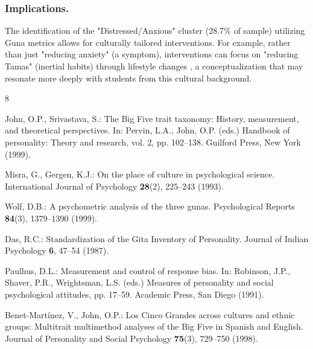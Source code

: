 \documentclass[runningheads]{llncs}
\begin{document}
\subsubsection{Implications.}
The identification of the "Distressed/Anxious" cluster (28.7\% of sample) utilizing Guna metrics allows for culturally tailored interventions. For example, rather than just "reducing anxiety" (a symptom), interventions can focus on "reducing Tamas" (inertial habits) through lifestyle changes \cite{wolf1999}, a conceptualization that may resonate more deeply with students from this cultural background.

\begin{thebibliography}{8}

John, O.P., Srivastava, S.: The Big Five trait taxonomy: History, measurement, and theoretical perspectives. In: Pervin, L.A., John, O.P. (eds.) Handbook of personality: Theory and research, vol. 2, pp. 102--138. Guilford Press, New York (1999).

Misra, G., Gergen, K.J.: On the place of culture in psychological science. International Journal of Psychology \textbf{28}(2), 225--243 (1993).

Wolf, D.B.: A psychometric analysis of the three gunas. Psychological Reports \textbf{84}(3), 1379--1390 (1999).

Das, R.C.: Standardization of the Gita Inventory of Personality. Journal of Indian Psychology \textbf{6}, 47--54 (1987).

Paulhus, D.L.: Measurement and control of response bias. In: Robinson, J.P., Shaver, P.R., Wrightsman, L.S. (eds.) Measures of personality and social psychological attitudes, pp. 17--59. Academic Press, San Diego (1991).

Benet-Martínez, V., John, O.P.: Los Cinco Grandes across cultures and ethnic groups: Multitrait multimethod analyses of the Big Five in Spanish and English. Journal of Personality and Social Psychology \textbf{75}(3), 729--750 (1998).

\end{thebibliography}
\end{document}
